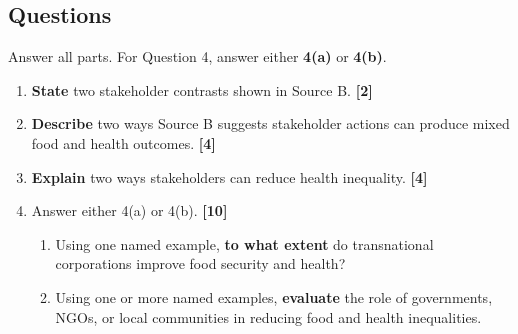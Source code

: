 \documentclass[11pt,a4paper]{article}
\newcommand{\term}[1]{\textcolor{HeadingBlue}{\textbf{#1}}}
\newcommand{\exam}[1]{\textcolor{AccentTeal}{\textbf{#1}}}
\newcommand{\markpts}[1]{\hfill\textbf{[#1]}}
\begin{document}
\subsection{Questions}

Answer all parts. For Question 4, answer either \term{4(a)} or \term{4(b)}.

\begin{enumerate}
  \item \exam{State} two stakeholder contrasts shown in Source B. \markpts{2}

  \item \exam{Describe} two ways Source B suggests stakeholder actions can
  produce mixed food and health outcomes. \markpts{4}

  \item \exam{Explain} two ways stakeholders can reduce health inequality.
  \markpts{4}

  \item Answer either 4(a) or 4(b). \markpts{10}
  \begin{enumerate}[label=\textbf{\alph*.},leftmargin=1.6em]
    \item Using one named example, \exam{to what extent} do transnational
    corporations improve food security and health?

    \item Using one or more named examples, \exam{evaluate} the role of
    governments, NGOs, or local communities in reducing food and health
    inequalities.
  \end{enumerate}
\end{enumerate}
\end{document}
